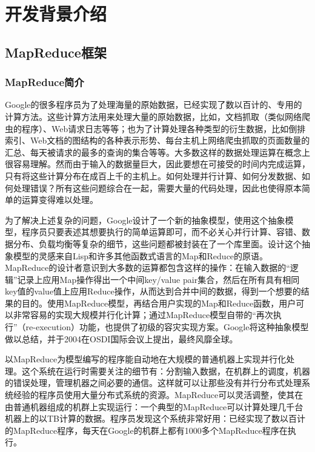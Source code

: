 \chapter{开发背景介绍}
\label{chap:2}

\section{MapReduce框架}
\subsection[MapReduce简介]{MapReduce简介\cite{paper:Google-MapReduce}}
Google的很多程序员为了处理海量的原始数据，已经实现了数以百计的、专用的计算方法。这些计算方法用来处理大量的原始数据，比如，文档抓取（类似网络爬虫的程序）、Web请求日志等等；也为了计算处理各种类型的衍生数据，比如倒排索引、Web文档的图结构的各种表示形势、每台主机上网络爬虫抓取的页面数量的汇总、每天被请求的最多的查询的集合等等。大多数这样的数据处理运算在概念上很容易理解。然而由于输入的数据量巨大，因此要想在可接受的时间内完成运算，只有将这些计算分布在成百上千的主机上。如何处理并行计算、如何分发数据、如何处理错误？所有这些问题综合在一起，需要大量的代码处理，因此也使得原本简单的运算变得难以处理。

为了解决上述复杂的问题，Google设计了一个新的抽象模型，使用这个抽象模型，程序员只要表述其想要执行的简单运算即可，而不必关心并行计算、容错、数据分布、负载均衡等复杂的细节，这些问题都被封装在了一个库里面。设计这个抽象模型的灵感来自Lisp和许多其他函数式语言的Map和Reduce的原语。MapReduce的设计者意识到大多数的运算都包含这样的操作：在输入数据的“逻辑”记录上应用Map操作得出一个中间key/value pair集合，然后在所有具有相同key值的value值上应用Reduce操作，从而达到合并中间的数据，得到一个想要的结果的目的。使用MapReduce模型，再结合用户实现的Map和Reduce函数，用户可以非常容易的实现大规模并行化计算；通过MapReduce模型自带的“再次执行”（re-execution）功能，也提供了初级的容灾实现方案。Google将这种抽象模型做以总结，并于2004在OSDI国际会议上提出，最终风靡全球。

以MapReduce为模型编写的程序能自动地在大规模的普通机器上实现并行化处理。这个系统在运行时需要关注的细节有：分割输入数据，在机群上的调度，机器的错误处理，管理机器之间必要的通信。这样就可以让那些没有并行分布式处理系统经验的程序员使用大量分布式系统的资源。MapReduce可以灵活调整，使其在由普通机器组成的机群上实现运行：一个典型的MapReduce可以计算处理几千台机器上的以TB计算的数据。程序员发现这个系统非常好用：已经实现了数以百计的MapReduce程序，每天在Google的机群上都有1000多个MapReduce程序在执行。

